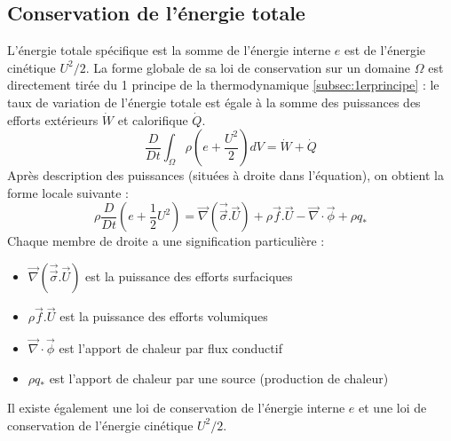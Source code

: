 \subsection{Conservation de l'énergie totale}
L'énergie totale spécifique est la somme de l'énergie interne $e$ est de l'énergie cinétique $U^2/2$. La forme globale de sa loi de conservation sur un domaine $\Omega$ est directement tirée du 1 principe de la thermodynamique \ref{subsec:1erprincipe} : le taux de variation de l'énergie totale est égale à la somme des puissances des efforts extérieurs $\dot{W}$ et calorifique $\dot{Q}$.
%
\begin{equation}
    \frac{D}{Dt} \int_{\Omega} \rho \left( e + \frac{U^2}{2} \right) dV = \dot{W} + \dot{Q}
\end{equation}
%
Après description des puissances (situées à droite dans l'équation), on obtient la forme locale suivante :
%
\begin{equation}
    \rho \frac{D}{Dt} \left( e + \frac{1}{2}U^2 \right)
    = \vec{\nabla} \left( \vec{\vec{\sigma}} . \vec{U} \right)
    + \rho \vec{f} . \vec{U}
    - \vec{\nabla} \cdot \vec{\phi}
    + \rho q_*
\end{equation}
%
Chaque membre de droite a une signification particulière :

\begin{itemize}
    \item $\vec{\nabla} \left( \vec{\vec{\sigma}} . \vec{U} \right)$ est la puissance des efforts surfaciques
    \item $\rho \vec{f} . \vec{U}$ est la puissance des efforts volumiques
    \item $\vec{\nabla} \cdot \vec{\phi}$ est l'apport de chaleur par flux conductif
    \item $\rho q_*$ est l'apport de chaleur par une source (production de chaleur)
\end{itemize}

Il existe également une loi de conservation de l'énergie interne $e$ et une loi de conservation de l'énergie cinétique $U^2/2$.
